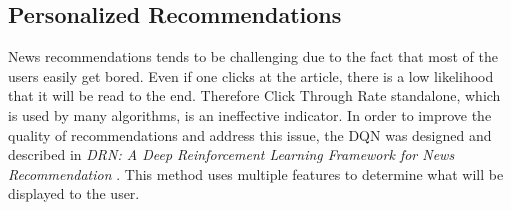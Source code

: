 \subsection{Personalized Recommendations}
\label{sub:intro-personalized-reccomendations}
News recommendations tends to be challenging due to the fact that most of the users easily get bored. Even if one clicks at the article,
there is a low likelihood that it will be read to the end. Therefore Click Through Rate standalone, which is used by many algorithms, is an
ineffective indicator. In order to improve the quality of recommendations and address this issue, the DQN was designed and described in
\emph{DRN: A Deep Reinforcement Learning Framework for News Recommendation} \cite{DRNNewsRecommendaiton}. This method uses multiple features
to determine what will be displayed to the user.
